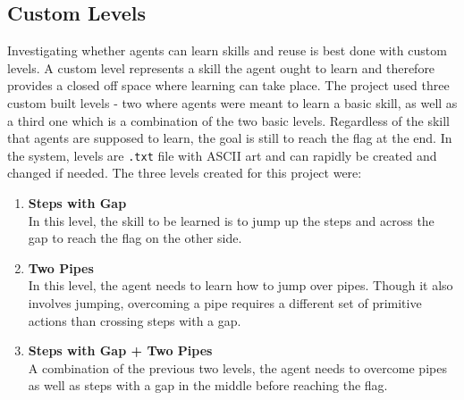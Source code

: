 \documentclass[notitlepage,a4paper,11pt]{article}
\begin{document}
\subsection{Custom Levels}\label{custom_levels}
Investigating whether agents can learn skills and reuse is best done with custom levels. A custom level represents a skill the agent ought to learn and therefore provides a closed off space where learning can take place. The project used three custom built levels - two where agents were meant to learn a basic skill, as well as a third one which is a combination of the two basic levels. Regardless of the skill that agents are supposed to learn, the goal is still to reach the flag at the end. In the system, levels are \texttt{.txt} file with ASCII art and can rapidly be created and changed if needed. The three levels created for this project were:

\begin{enumerate}
	\item \textbf{Steps with Gap}\\
	In this level, the skill to be learned is to jump up the steps and across the gap to reach the flag on the other side.
	
	
	\item \textbf{Two Pipes}\\
	In this level, the agent needs to learn how to jump over pipes. Though it also involves jumping, overcoming a pipe requires a different set of primitive actions than crossing steps with a gap.
	
	\item \textbf{Steps with Gap + Two Pipes}\\
	A combination of the previous two levels, the agent needs to overcome pipes as well as steps with a gap in the middle before reaching the flag.
\end{enumerate}
\end{document}
